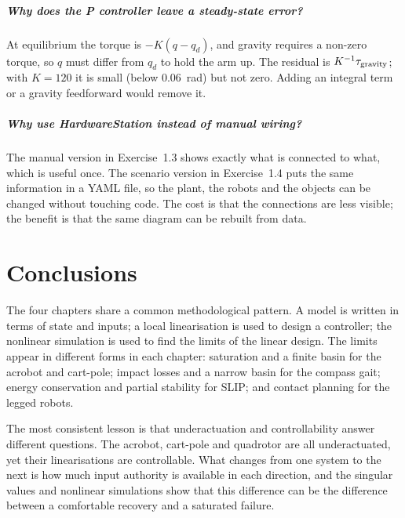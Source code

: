 \documentclass[11pt]{report}
\begin{document}
\paragraph{Why does the P controller leave a steady-state error?}  At
equilibrium the torque is $-K(q-q_d)$, and gravity requires a non-zero torque,
so $q$ must differ from $q_d$ to hold the arm up.  The residual is
$K^{-1}\tau_{\rm gravity}$; with $K=120$ it is small (below 0.06~rad) but not
zero.  Adding an integral term or a gravity feedforward would remove it.

\paragraph{Why use HardwareStation instead of manual wiring?}  The manual
version in Exercise~1.3 shows exactly what is connected to what, which is
useful once.  The scenario version in Exercise~1.4 puts the same information in
a YAML file, so the plant, the robots and the objects can be changed without
touching code.  The cost is that the connections are less visible; the benefit
is that the same diagram can be rebuilt from data.

\chapter{Conclusions}

The four chapters share a common methodological pattern.  A model is written
in terms of state and inputs; a local linearisation is used to design a
controller; the nonlinear simulation is used to find the limits of the linear
design.  The limits appear in different forms in each chapter: saturation and
a finite basin for the acrobot and cart-pole; impact losses and a narrow basin
for the compass gait; energy conservation and partial stability for SLIP; and
contact planning for the legged robots.

The most consistent lesson is that underactuation and controllability answer
different questions.  The acrobot, cart-pole and quadrotor are all
underactuated, yet their linearisations are controllable.  What changes from
one system to the next is how much input authority is available in each
direction, and the singular values and nonlinear simulations show that this
difference can be the difference between a comfortable recovery and a
saturated failure.
\end{document}
